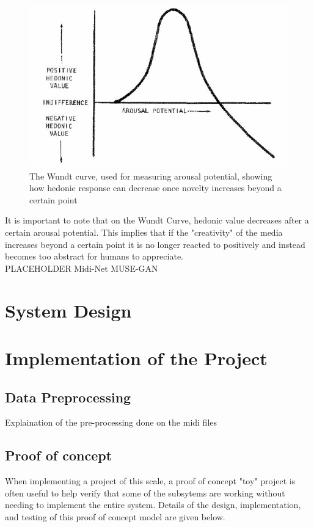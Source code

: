 \documentclass[10pt]{article}
\begin{document}
\begin{figure}[H]
\centering
\includegraphics[scale=0.8]{wundt_curve}
\caption[Wundt curve for measuring arousal]{\label{fig:wundt_curve} The Wundt curve, used for measuring arousal potential, showing how hedonic response can decrease once novelty increases beyond a certain point}
\end{figure}

It is important to note that on the Wundt Curve, hedonic value decreases after a certain arousal potential. This implies that if the "creativity" of the media increases beyond a certain point it is no longer reacted to positively and instead becomes too abstract for humans to appreciate. \\

PLACEHOLDER Midi-Net \cite{Yang2017} MUSE-GAN \cite{Dong2017}


\section{System Design}


\section{Implementation of the Project}
\subsection{Data Preprocessing}
Explaination of the pre-processing done on the midi files

\subsection{Proof of concept}
When implementing a project of this scale, a proof of concept "toy" project is often useful to help verify that some of the subsytems are working without needing to implement the entire system. Details of the design, implementation, and testing of this proof of concept model are given below.
\end{document}
